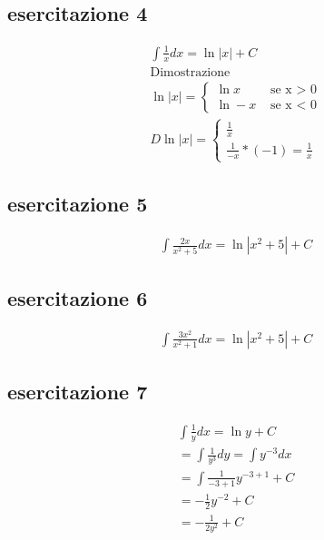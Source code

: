 \subsection{esercitazione 4}
	\begin{equation}
		\begin{matrix}
			\int \frac{1}{x}dx=\ln\left|x\right|+C\\
			\text{Dimostrazione}\\
			\ln\left|x\right|=\begin{cases}
					\ln x & \text{ se x > 0}\\
					\ln -x & \text{ se x < 0}
			\end{cases}\\
			D\ln\left|x\right|=\begin{cases}
				\frac{1}{x}\\
				\frac{1}{-x}*(-1)=\frac{1}{x}
			\end{cases}
		\end{matrix}
	\end{equation}
\subsection{esercitazione 5}
	\begin{equation}
		\begin{matrix}
			\int \frac{2x}{x^2+5}dx=\ln\left|x^2+5\right|+C
		\end{matrix}
	\end{equation}
\subsection{esercitazione 6}
	\begin{equation}
		\begin{matrix}
			\int \frac{3x^2}{x^2+1}dx=\ln\left|x^2+5\right|+C
		\end{matrix}
	\end{equation}
\subsection{esercitazione 7}
	\begin{equation}
		\begin{matrix}
			\int \frac{1}{y}dx=\ln y+C\\
			=\int \frac{1}{y^3}dy=\int y^{-3}dx\\
			=\int \frac{1}{-3+1}y^{-3+1}+C\\
			=-\frac{1}{2}y^{-2}+C\\
			=-\frac{1}{2y^2}+C
		\end{matrix}
	\end{equation}

